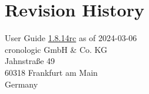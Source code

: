 \documentclass[12pt,notitlepage,a4paper]{report}
\newcommand{\ifxHPTDC}[2]{#1}
\newcommand{\ifxHPTDC}[2]{#2}
\newcommand{\ttinput}[1]{}
\newcommand{\ttinput}[1]{}
\newcommand{\ttinput}[1]{}
\newcommand{\ugrev}{{1.8.14rc}}
\begin{document}
    \chapter{Revision History} 
        \noindent
        User Guide \hyperlink{ugrev}{\ugrev} as of 2024-03-06\\  %
        cronologic GmbH \& Co. KG\\
        Jahnstraße 49\\
        60318 Frankfurt am Main\\Germany\\
        \ttinput{FwRev.tex}
        \ifxHPTDC{}{} 
        

    \ifxHPTDC{}{
    \phantomsection
    \addcontentsline{toc}{chapter}{Erratum}
    \chapter*{Erratum}
        
    }
\end{document}
